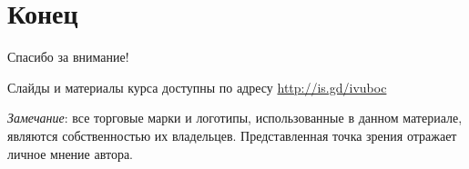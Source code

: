 \documentclass{beamer}
\begin{document}
\section{Конец}
\begin{frame}

{\huge{Спасибо за внимание!}\par}

\vfill

Слайды и материалы курса доступны по адресу \url{http://is.gd/ivuboc} %

\vfill

\tiny{\textit{Замечание}: все торговые марки и логотипы, использованные в данном материале, являются собственностью их владельцев. Представленная точка зрения отражает личное мнение автора.
}

\end{frame}
\end{document}
